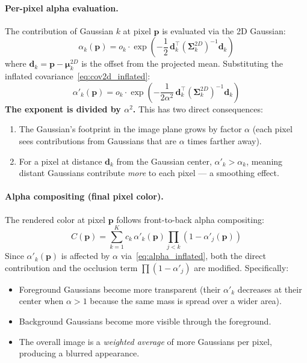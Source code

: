 \documentclass[11pt]{article}
\begin{document}
\paragraph{Per-pixel alpha evaluation.}
The contribution of Gaussian $k$ at pixel $\mathbf{p}$ is evaluated via the 2D Gaussian:
\begin{equation}
    \alpha_k(\mathbf{p}) = o_k \cdot \exp\!\left( -\frac{1}{2} \, \mathbf{d}_k^\top \left(\boldsymbol{\Sigma}_{k}^{2D}\right)^{-1} \mathbf{d}_k \right)
\end{equation}
where $\mathbf{d}_k = \mathbf{p} - \boldsymbol{\mu}_k^{2D}$ is the offset from the projected mean. Substituting the inflated covariance~\eqref{eq:cov2d_inflated}:
\begin{equation}
    \alpha'_k(\mathbf{p}) = o_k \cdot \exp\!\left( -\frac{1}{2\alpha^2} \, \mathbf{d}_k^\top \left(\boldsymbol{\Sigma}_{k}^{2D}\right)^{-1} \mathbf{d}_k \right)
    \label{eq:alpha_inflated}
\end{equation}
\textbf{The exponent is divided by $\alpha^2$.} This has two direct consequences:
\begin{enumerate}
    \item The Gaussian's footprint in the image plane grows by factor $\alpha$ (each pixel sees contributions from Gaussians that are $\alpha$ times farther away).
    \item For a pixel at distance $\mathbf{d}_k$ from the Gaussian center, $\alpha'_k > \alpha_k$, meaning distant Gaussians contribute \emph{more} to each pixel --- a smoothing effect.
\end{enumerate}

\paragraph{Alpha compositing (final pixel color).}
The rendered color at pixel $\mathbf{p}$ follows front-to-back alpha compositing:
\begin{equation}
    C(\mathbf{p}) = \sum_{k=1}^{K} c_k \, \alpha'_k(\mathbf{p}) \prod_{j < k} \left(1 - \alpha'_j(\mathbf{p})\right)
    \label{eq:compositing}
\end{equation}
Since $\alpha'_k(\mathbf{p})$ is affected by $\alpha$ via~\eqref{eq:alpha_inflated}, both the direct contribution and the occlusion term $\prod(1-\alpha'_j)$ are modified. Specifically:
\begin{itemize}
    \item Foreground Gaussians become more transparent (their $\alpha'_k$ decreases at their center when $\alpha > 1$ because the same mass is spread over a wider area).
    \item Background Gaussians become more visible through the foreground.
    \item The overall image is a \emph{weighted average} of more Gaussians per pixel, producing a blurred appearance.
\end{itemize}
\end{document}
